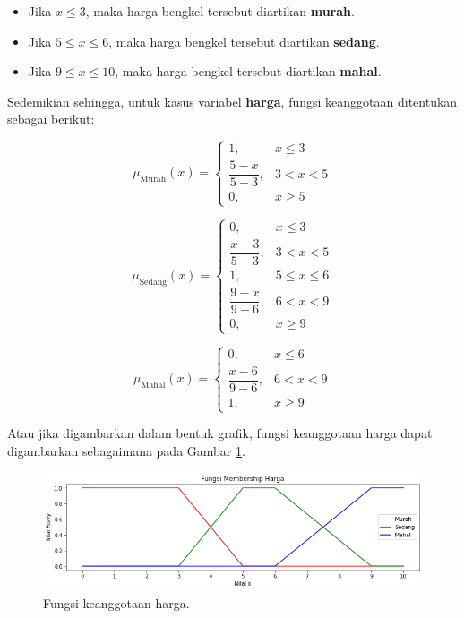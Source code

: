 \documentclass[12pt,a4paper]{article}
\theoremstyle{remark}
\begin{document}
\begin{itemize}
    \item Jika $x \leq 3$, maka harga bengkel tersebut diartikan \textbf{murah}.
    \item Jika $5 \leq x \leq 6$, maka harga bengkel tersebut diartikan \textbf{sedang}.
    \item Jika $9 \leq x \leq 10$, maka harga bengkel tersebut diartikan \textbf{mahal}.
\end{itemize}


Sedemikian sehingga, untuk kasus variabel \textbf{harga}, fungsi keanggotaan ditentukan sebagai berikut:

\[
    \mu_{\text{Murah}}(x) =
    \begin{cases}
        1,                    & x \leq 3  \\
        \dfrac{5 - x}{5 - 3}, & 3 < x < 5 \\
        0,                    & x \geq 5
    \end{cases}
\]

\[
    \mu_{\text{Sedang}}(x) =
    \begin{cases}
        0,                    & x \leq 3        \\
        \dfrac{x - 3}{5 - 3}, & 3 < x < 5       \\
        1,                    & 5 \leq x \leq 6 \\
        \dfrac{9 - x}{9 - 6}, & 6 < x < 9       \\
        0,                    & x \geq 9
    \end{cases}
\]

\[
    \mu_{\text{Mahal}}(x) =
    \begin{cases}
        0,                    & x \leq 6  \\
        \dfrac{x - 6}{9 - 6}, & 6 < x < 9 \\
        1,                    & x \geq 9
    \end{cases}
\]

Atau jika digambarkan dalam bentuk grafik, fungsi keanggotaan harga dapat digambarkan sebagaimana pada Gambar \ref{fig:member_harga}.
\begin{figure}[H]
    \centering
    \includegraphics[width=1\linewidth]{images/member_harga.png}
    \caption{Fungsi keanggotaan harga.}
    \label{fig:member_harga}
\end{figure}
\end{document}
